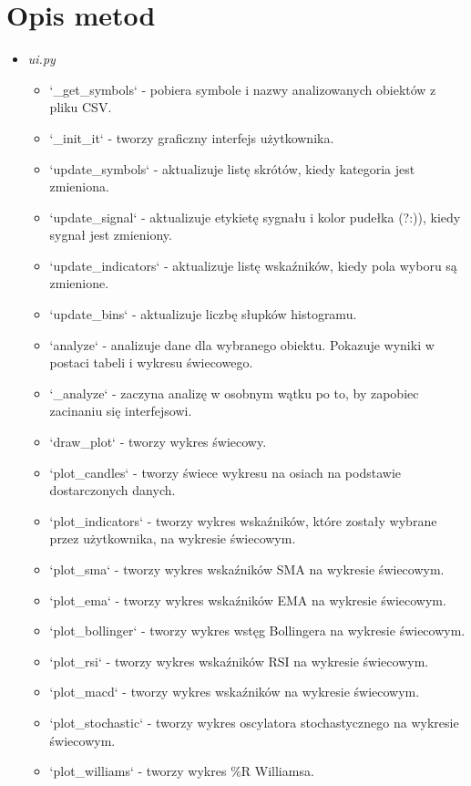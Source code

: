 \documentclass[12pt]{article}
\begin{document}
	\section{Opis metod}\label{sec:uzyte-metody}
	\begin{itemize}
	\item \textit{ui.py}
		\begin{itemize}
			\item `\_get\_symbols` - pobiera symbole i nazwy analizowanych obiektów z pliku CSV.
			\item `\_init\_it` - tworzy graficzny interfejs użytkownika.
			\item `update\_symbols` - aktualizuje listę skrótów, kiedy kategoria jest zmieniona.
			\item `update\_signal` - aktualizuje etykietę sygnału i kolor pudełka (?:)), kiedy sygnał jest zmieniony.
			\item `update\_indicators` - aktualizuje listę wskaźników, kiedy pola wyboru są zmienione.
			\item `update\_bins` - aktualizuje liczbę słupków histogramu.
			\item `analyze` - analizuje dane dla wybranego obiektu.
			Pokazuje wyniki w postaci tabeli i wykresu świecowego.
			\item `\_analyze` - zaczyna analizę w osobnym wątku po to, by zapobiec zacinaniu się interfejsowi.
			\item `draw\_plot` - tworzy wykres świecowy.
			\item `plot\_candles` - tworzy świece wykresu na osiach na podstawie dostarczonych danych.
			\item `plot\_indicators` - tworzy wykres wskaźników, które zostały wybrane przez użytkownika, na wykresie świecowym.
			\item `plot\_sma` - tworzy wykres wskaźników SMA na wykresie świecowym.
			\item `plot\_ema` - tworzy wykres wskaźników EMA na wykresie świecowym.
			\item `plot\_bollinger` - tworzy wykres wstęg Bollingera na wykresie świecowym.
			\item `plot\_rsi` - tworzy wykres wskaźników RSI na wykresie świecowym.
			\item `plot\_macd` - tworzy wykres wskaźników na wykresie świecowym.
			\item `plot\_stochastic` - tworzy wykres oscylatora stochastycznego na wykresie świecowym.
			\item `plot\_williams` - tworzy wykres \%R Williamsa.

\end{itemize}
\end{itemize}
\end{document}
